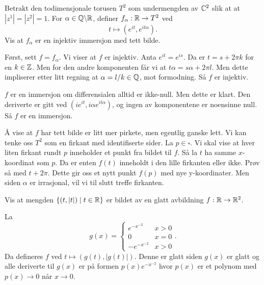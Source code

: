 \documentclass[11pt, english]{article}
\begin{document}
\begin{exc}
Betrakt den todimensjonale torusen $T^2$ som undermengden av $\mathbb{C}^2$ slik at at $|z^1|=|z^2|=1$. For $\alpha \in \mathbb{Q} \backslash \mathbb{R}$, definer $f_\alpha:\mathbb{R} \to T^2$ ved
$$
t \mapsto \left( e^{it}, e^{it\alpha} \right).
$$
Vis at $f_\alpha$ er en injektiv immersjon med tett bilde.
\end{exc}
\begin{sol}
Først, sett $f=f_\alpha$. Vi viser at $f$ er injektiv. Anta $e^{it}=e^{is}$. Da er $t = s + 2 \pi k$ for en $k \in \mathbb{Z}$. Men for den andre komponenten får vi at $t\alpha = s\alpha + 2 \pi l$. Men dette impliserer etter litt regning at $\alpha = l/k \in \mathbb{Q}$, mot formodning. Så $f$ er injektiv.

$f$ er en immersjon om differensialen alltid er ikke-null. Men dette er klart. Den deriverte er gitt ved $(ie^{it}, i \alpha e^{it \alpha })$, og ingen av komponentene er noensinne null. Så $f$ er en immersjon.

Å vise at $f$ har tett bilde er litt mer pirkete, men egentlig ganske lett. Vi kan tenke oss $T^2$ som en firkant med identifiserte sider. La $p \in \square$. Vi skal vise at hver liten firkant rundt $p$ inneholder et punkt fra bildet til $f$. Så la $t$ ha samme $x$-koordinat som $p$. Da er enten $f(t)$ inneholdt i den lille firkanten eller ikke. Prøv så med $t+2 \pi$. Dette gir oss et nytt punkt $f(p)$ med nye y-koordinater. Men siden $\alpha$ er irrasjonal, vil vi til slutt treffe firkanten.
\end{sol}

\begin{exc}
Vis at mengden $\{ (t, |t|) \mid t \in \mathbb{R} \}$ er bildet av en glatt avbildning $f:\mathbb{R} \to \mathbb{R}^2$.
\end{exc}
\begin{sol}
La
$$
g(x) = \begin{cases}
e^{-x^{-2}} & x > 0 \\
0 & x= 0 \\
-e^{-x^{-2}} & x > 0
\end{cases}.
$$
Da defineres $f$ ved $t \mapsto (g(t),\lvert g (t)\rvert )$. Denne er glatt siden $g(x)$ er glatt og alle deriverte til $g(x)$ er på formen $p(x)e^{-x^{-2}}$ hvor $p(x)$ er et polynom med $p(x) \to 0$ når $x \to 0$. 
\end{sol}
\end{document}
